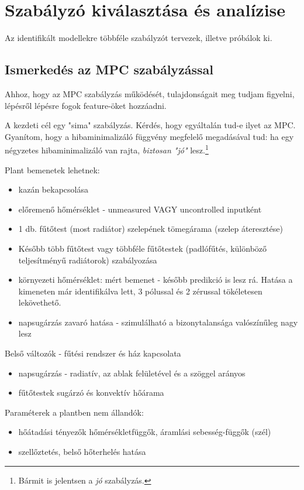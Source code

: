 \chapter{Szabályzó kiválasztása és analízise}


Az identifikált modellekre többféle szabályzót tervezek, illetve próbálok ki.

\section{Ismerkedés az MPC szabályzással}

Ahhoz, hogy az MPC szabályzás működését, tulajdonságait meg tudjam figyelni, lépésről lépésre fogok feature-öket hozzáadni.

A kezdeti cél egy "sima" szabályzás. Kérdés, hogy egyáltalán tud-e ilyet az MPC. Gyanítom, hogy a hibaminimalizáló függvény megfelelő megadásával tud: ha egy négyzetes hibaminimalizáló van rajta, \textit{biztosan "jó"} lesz.\footnote{Bármit is jelentsen a \textit{jó} szabályzás.}

\begin{formal}
	Plant bemenetek lehetnek:
	\begin{itemize}[noitemsep,topsep=-8pt,parsep=0pt,partopsep=0pt]
		\item kazán bekapcsolása
		\item előremenő hőmérséklet - unmeasured VAGY uncontrolled inputként
		\item 1 db. fűtőtest (most radiátor) szelepének tömegárama (szelep áteresztése)
		\item Később több fűtőtest vagy többféle fűtőtestek (padlófűtés, különböző teljesítményű radiátorok) szabályozása
		\item környezeti hőmérséklet: mért bemenet - később predikció is lesz rá. Hatása a kimeneten már identifikálva lett, 3 pólussal és 2 zérussal tökéletesen lekövethető.
		\item napsugárzás zavaró hatása - szimulálható  a bizonytalansága valószínűleg nagy lesz
	\end{itemize}

	Belső változók - fűtési rendszer és ház kapcsolata
	\begin{itemize}[noitemsep,topsep=-6pt,parsep=0pt,partopsep=0pt]
			\item napsugárzás - radiatív, az ablak felületével és a szöggel arányos
			\item fűtőtestek sugárzó és konvektív hőárama
	\end{itemize}

	Paraméterek a plantben nem állandók:
	\begin{itemize}[noitemsep,topsep=-6pt,parsep=0pt,partopsep=0pt]
		\item hőátadási tényezők hőmérsékletfüggők, áramlási sebesség-függők (szél)
		\item szellőztetés, belső hőterhelés hatása
	\end{itemize}
\end{formal}

